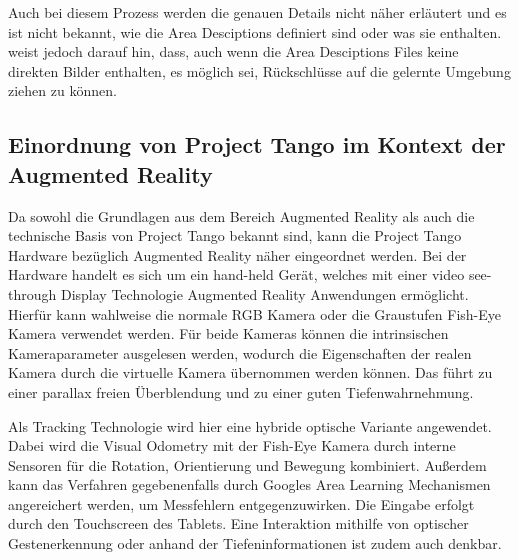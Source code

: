 Auch bei diesem Prozess werden die genauen Details nicht näher erläutert und es ist nicht bekannt, wie die Area Desciptions definiert sind oder was sie enthalten. \citet{GoogleDevelopersConcepts:online} weist jedoch darauf hin, dass, auch wenn die Area Desciptions Files keine direkten Bilder enthalten, es möglich sei, Rückschlüsse auf die gelernte Umgebung ziehen zu können. 

\subsection{Einordnung von Project Tango im Kontext der Augmented Reality} \label{sec:classification_project_tango}

Da sowohl die Grundlagen aus dem Bereich Augmented Reality als auch die technische Basis von Project Tango bekannt sind, kann die Project Tango Hardware bezüglich Augmented Reality näher eingeordnet werden. Bei der Hardware handelt es sich um ein hand-held Gerät, welches mit einer video see-through Display Technologie Augmented Reality Anwendungen ermöglicht. Hierfür kann wahlweise die normale RGB Kamera oder die Graustufen Fish-Eye Kamera verwendet werden. Für beide Kameras können die intrinsischen Kameraparameter ausgelesen werden, wodurch die Eigenschaften der realen Kamera durch die virtuelle Kamera übernommen werden können. Das führt zu einer parallax freien Überblendung und zu einer guten Tiefenwahrnehmung. 

Als Tracking Technologie wird hier eine hybride optische Variante angewendet. Dabei wird die Visual Odometry mit der Fish-Eye Kamera durch interne Sensoren für die Rotation, Orientierung und Bewegung kombiniert. Außerdem kann das Verfahren gegebenenfalls durch Googles Area Learning Mechanismen angereichert werden, um Messfehlern entgegenzuwirken. Die Eingabe erfolgt durch den Touchscreen des Tablets. Eine Interaktion mithilfe von optischer Gestenerkennung oder anhand der Tiefeninformationen ist zudem auch denkbar. 


